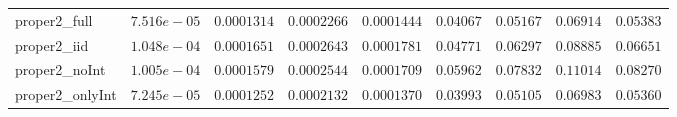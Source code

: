 \begin{table}
\begin{tabular}{lcccccccc}
proper2_full  & $7.516e-05$ & $0.0001314$ & $0.0002266$ & $0.0001444$ & $0.04067$ & $0.05167$ & $0.06914$ & $0.05383$ \\
proper2_iid  & $1.048e-04$ & $0.0001651$ & $0.0002643$ & $0.0001781$ & $0.04771$ & $0.06297$ & $0.08885$ & $0.06651$ \\
proper2_noInt  & $1.005e-04$ & $0.0001579$ & $0.0002544$ & $0.0001709$ & $0.05962$ & $0.07832$ & $0.11014$ & $0.08270$ \\
proper2_onlyInt  & $7.245e-05$ & $0.0001252$ & $0.0002132$ & $0.0001370$ & $0.03993$ & $0.05105$ & $0.06983$ & $0.05360$ \\
\hline 
\end{tabular}


\end{table}